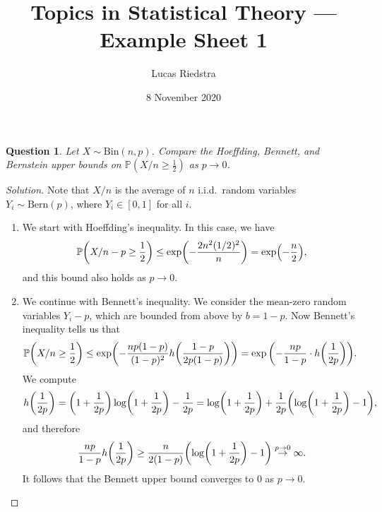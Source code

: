 \documentclass{article}
\title{Topics in Statistical Theory --- Example Sheet 1} %
\author{Lucas Riedstra}
\date{8 November 2020} %
\theoremstyle{plain}
\newtheorem{question}{Question}
\theoremstyle{remark}
\newenvironment{solution}{\begin{proof}[Solution]\renewcommand\qedsymbol{}}{\end{proof}}
\newcommand{\Bb}{\mathbb}
\newcommand{\Rm}{\mathrm}
\newcommand{\PP}{\Bb P}
\begin{document}
\maketitle

\setcounter{question}{3}

\begin{question}
	Let $X \sim \Rm{Bin}(n, p)$. Compare the Hoeffding, Bennett, and Bernstein upper bounds on $\PP(X/n \geq \frac12)$ as $p \to 0$. 
\end{question}

\begin{solution}
	Note that $X/n$ is the average of $n$ i.i.d.\ random variables $Y_i \sim \Rm{Bern}(p)$, where $Y_i \in [0, 1]$ for all $i$.  
	\begin{enumerate}
		\item 

	We start with Hoeffding's inequality. In this case, we have
	\[
	\PP\qty(X/n - p \geq \frac12) \leq \exp(-\frac{2n^2(1/2)^2}{n}) = \exp(- \frac n2),
	\]
	and this bound also holds as $p \to 0$. 
	
\item 	We continue with Bennett's inequality. We consider the mean-zero random variables $Y_i - p$, which are bounded from above by $b = 1 - p$. Now Bennett's inequality tells us that
	\begin{align*}
		\PP\qty(X/n \geq \frac12) &\leq \exp(- \frac{np(1-p)}{(1-p)^2} h\qty(\frac{1-p}{2p(1-p)})) = \exp\qty( -\frac{np}{1-p} \cdot  h\qty(\frac{1}{2p})).
	\end{align*}
We compute
\[
h\qty(\frac1{2p}) = \qty(1 + \frac1{2p}) \log(1 + \frac1{2p}) - \frac1{2p} = \log(1 + \frac1{2p}) + \frac1{2p} \qty(\log(1 + \frac1{2p}) - 1),
\]
and therefore
\[
\frac{np}{1-p} h\qty(\frac1{2p}) \geq  \frac{n}{2(1-p)} \qty(\log(1 + \frac1{2p}) - 1) \overset{p \to 0}\to \infty. 
\]
It follows that the Bennett upper bound converges to 0 as $p \to 0$. 
	


\end{enumerate}
\end{solution}
\end{document}
